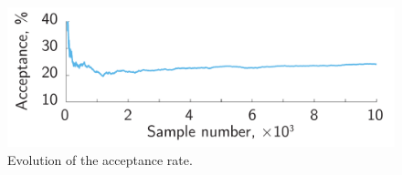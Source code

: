 \begin{figure}
  \centering
  \includegraphics[width=0.7\linewidth]{include/assets/acceptance.pdf}
  \caption{Evolution of the acceptance rate.}
  \vspace{-0.5em}
\end{figure}
